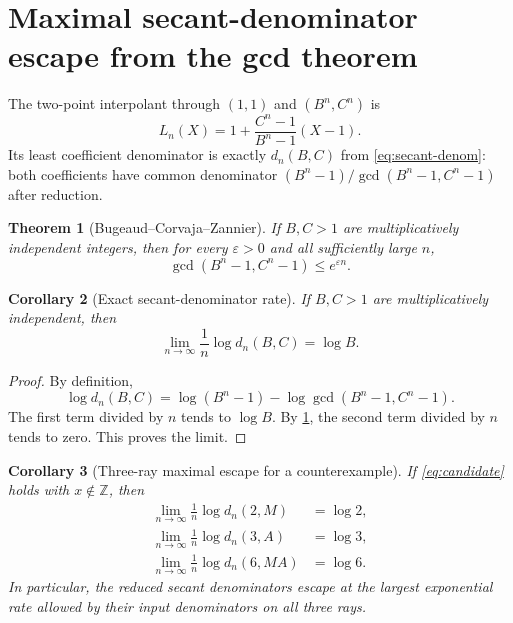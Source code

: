 \documentclass[11pt]{article}
\newtheorem{theorem}{Theorem}[section]
\newtheorem{corollary}[theorem]{Corollary}
\theoremstyle{definition}
\newcommand{\Z}{\mathbb Z}
\begin{document}
\section{Maximal secant-denominator escape from the gcd theorem}
\label{sec:BCZ}

The two-point interpolant through $(1,1)$ and $(B^n,C^n)$ is
\[
 L_n(X)=1+\frac{C^n-1}{B^n-1}(X-1).
\]
Its least coefficient denominator is exactly $d_n(B,C)$ from
\eqref{eq:secant-denom}: both coefficients have common denominator
$(B^n-1)/\gcd(B^n-1,C^n-1)$ after reduction.

\begin{theorem}[Bugeaud--Corvaja--Zannier]
\label{thm:BCZ}
If $B,C>1$ are multiplicatively independent integers, then for every $\varepsilon>0$ and all
sufficiently large $n$,
\begin{equation}
 \gcd(B^n-1,C^n-1)\le e^{\varepsilon n}.
 \label{eq:BCZ}
\end{equation}
\end{theorem}

\begin{corollary}[Exact secant-denominator rate]
\label{cor:secant-rate}
If $B,C>1$ are multiplicatively independent, then
\begin{equation}
 \lim_{n\to\infty}\frac1n\log d_n(B,C)=\log B.
 \label{eq:secant-rate}
\end{equation}
\end{corollary}

\begin{proof}
By definition,
\[
 \log d_n(B,C)
 =\log(B^n-1)-\log\gcd(B^n-1,C^n-1).
\]
The first term divided by $n$ tends to $\log B$.  By \cref{thm:BCZ}, the second term divided
by $n$ tends to zero.  This proves the limit.
\end{proof}

\begin{corollary}[Three-ray maximal escape for a counterexample]
\label{cor:three-ray-escape}
If \eqref{eq:candidate} holds with $x\notin\Z$, then
\begin{align}
 \lim_{n\to\infty}\frac1n\log d_n(2,M)&=\log2,\\
 \lim_{n\to\infty}\frac1n\log d_n(3,A)&=\log3,\\
 \lim_{n\to\infty}\frac1n\log d_n(6,MA)&=\log6.
 \label{eq:three-rates}
\end{align}
In particular, the reduced secant denominators escape at the largest exponential rate allowed
by their input denominators on all three rays.
\end{corollary}
\end{document}

